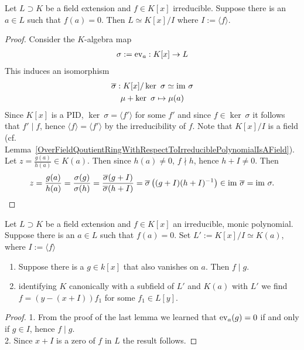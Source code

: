     \begin{lemma}
        Let $L\supset K$ be a field extension and $f\in K[x]$ irreducible. Suppose there is an $a\in L$ such that $f(a)=0$. Then $L\simeq  K[x]/I$ where $I:= \langle f\rangle$.
    \end{lemma}
    \begin{proof}
        Consider the $K$-algebra map
        \begin{gather*}
            \sigma := \mathrm{ev}_a : K[x]\rightarrow L
        \end{gather*}
        This induces an isomorphism 
        \begin{gather*}
            \overline {\sigma}: K[x]/\ker \ \sigma \simeq \mathrm{im} \ \sigma\\
            \mu + \ker \ \sigma \mapsto \mu(a)
        \end{gather*}
        Since $K[x]$ is a PID, $\ker \ \sigma = \langle f'\rangle$ for some $f'$ and since $f\in \ker \ \sigma$ it follows that $f'\mid f$, hence $\langle f\rangle =\langle f'\rangle$ by the irreducibility of $f$. Note that $K[x]/I$ is a field (cf. Lemma~\ref{OverFieldQoutientRingWithRespectToIrreduciblePolynomialIsAField}).
        Let $z=\frac{g(a)}{h(a)}\in K(a)$. Then since $h(a)\neq 0$, $f\nmid h$, hence $h+I\neq 0$. Then 
        $$z = \frac{g(a)}{h(a)} = \frac{\sigma(g)}{\sigma(h)}=\frac{\overline{\sigma}(g+I)}{\overline{\sigma}(h+I)}= \overline{\sigma}\left((g+I)(h+I)^{-1}\right)\in \im \ \overline{\sigma}=\im\ \sigma.$$ 
    \end{proof}
    \begin{lemma}\label{SplittingFieldLemma}
        Let $L\supset K$ be a field extension and $f\in K[x]$ an irreducible, monic polynomial. Suppose there is an $a\in L$ such that $f(a)=0$. Set $L':= K[x]/I\simeq K(a)$, where $I:=\langle f\rangle$ 
        \begin{enumerate}
            \item Suppose there is a $g\in k[x]$ that also vanishes on $a$. Then $f\mid g$.
            \item  identifying $K$ canonically with a subfield of $L'$ and $K(a)$ with $L'$ we find $f=(y-(x+I))f_1$ for some $f_1\in L[y]$.
        \end{enumerate}
    \end{lemma}
    \begin{proof}
        1. From the proof of the last lemma we learned that $\mathrm{ev}_a(g)=0$ if and only if $g\in I$, hence $f\mid g$.\\
        2. Since $x+I$ is a zero of $f$ in $L$ the result follows.  
    \end{proof}
